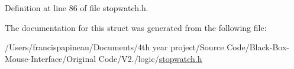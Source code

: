 \-Definition at line 86 of file stopwatch.\-h.



\-The documentation for this struct was generated from the following file\-:\begin{DoxyCompactItemize}
\item 
/\-Users/francispapineau/\-Documents/4th year project/\-Source Code/\-Black-\/\-Box-\/\-Mouse-\/\-Interface/\-Original Code/\-V2./logic/\hyperlink{stopwatch_8h}{stopwatch.\-h}\end{DoxyCompactItemize}
